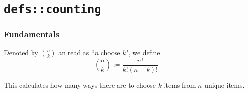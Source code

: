 \chapter{\texttt{defs::counting}}\label{f567323}

\begin{toc}
\end{toc}

\subsection{Fundamentals}\label{cc7428a}

\label{aff0ae6}

Denoted by $\binom nk$ an read as ``$n$ choose $k$", we define
$$
  \binom nk:=\frac{n!}{k!(n-k)!}
$$

This calculates how many ways there are to choose $k$ items from $n$ unique
items.

